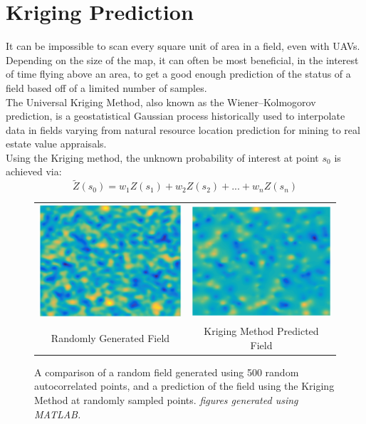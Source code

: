 \documentclass[11pt]{ucthesis}
\begin{document}
\section{Kriging Prediction}
It can be impossible to scan every square unit of area in a field, even with UAVs. Depending on the size of the map, it can often be most beneficial, in the interest of time flying above an area, to get a good enough prediction of the status of a field based off of a limited number of samples.\\
The Universal Kriging Method, also known as the Wiener–Kolmogorov prediction, is a geostatistical Gaussian process historically used to interpolate data in fields varying from natural resource location prediction for mining to real estate value appraisals.\\
Using the Kriging method, the unknown probability of interest at point $s_{0}$ is achieved via:
\begin{equation}
\widetilde{Z}(s_{0})=w_{1}Z(s_{1}) + w_{2}Z(s_{2}) + ... + w_{n}Z(s_{n})
\end{equation}
\begin{center}
	\begin{figure}[h]
		\begin{tabular}{cc}
			\centering
			\includegraphics[width=0.49\linewidth]{random_field.eps} &
			\includegraphics[width=0.49\linewidth]{kriging_prediction.eps} \\
			Randomly Generated Field & Kriging Method Predicted Field\\
		\end{tabular}
		\caption{A comparison of a random field generated using 500 random autocorrelated points, and a prediction of the field using the Kriging Method at randomly sampled points. \textit{figures generated using MATLAB.}}
	\end{figure}
\end{center}
\end{document}
